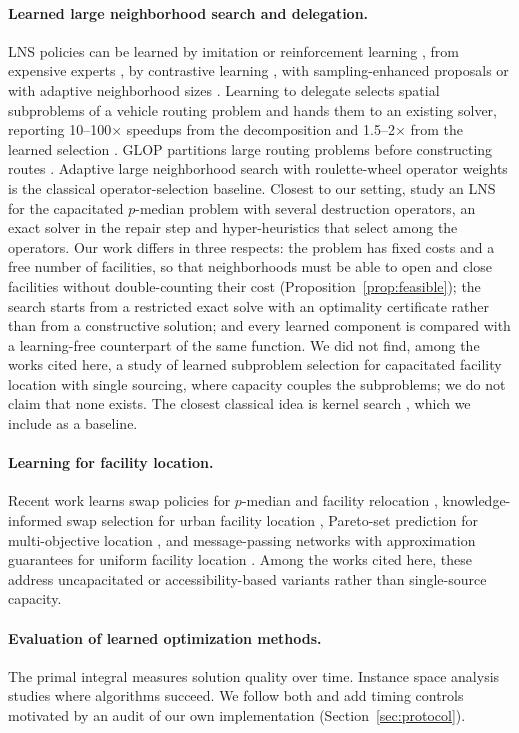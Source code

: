 \paragraph{Learned large neighborhood search and delegation.}
LNS policies can be learned by imitation or reinforcement learning \citep{song2020},
from expensive experts \citep{sonnerat2021}, by contrastive learning \citep{huang2023}, with
sampling-enhanced proposals \citep{feng2025spl} or with adaptive neighborhood sizes
\citep{xu2025hypaso}. Learning to delegate selects spatial subproblems of a vehicle routing
problem and hands them to an existing solver, reporting 10--100$\times$ speedups from the
decomposition and 1.5--2$\times$ from the learned selection \citep{li2021delegate}. GLOP
partitions large routing problems before constructing routes \citep{ye2024glop}. Adaptive large
neighborhood search with roulette-wheel operator weights \citep{ropke2006} is the classical
operator-selection baseline. Closest to our setting, \citet{gjergji2026} study an LNS for the
capacitated $p$-median problem with several destruction operators, an exact solver in the repair
step and hyper-heuristics that select among the operators. Our work differs in three respects:
the problem has fixed costs and a free number of facilities, so that neighborhoods must be able
to open and close facilities without double-counting their cost
(Proposition~\ref{prop:feasible}); the search starts from a restricted exact solve with an
optimality certificate rather than from a constructive solution; and every learned component is
compared with a learning-free counterpart of the same function. We did not find, among the works cited here, a study of learned
subproblem selection for capacitated facility location with single
sourcing, where capacity couples the subproblems; we do not claim that none exists. The closest
classical idea is kernel search
\citep{guastaroba2014}, which we include as a baseline.

\paragraph{Learning for facility location.}
Recent work learns swap policies for $p$-median and facility relocation \citep{guo2023swap},
knowledge-informed swap selection for urban facility location \citep{su2024urban}, Pareto-set
prediction for multi-objective location \citep{liu2022pareto}, and message-passing networks with
approximation guarantees for uniform facility location \citep{qian2026unifl}. Among the works cited here, these address
uncapacitated or accessibility-based variants rather than single-source capacity.

\paragraph{Evaluation of learned optimization methods.}
The primal integral \citep{berthold2013} measures solution quality over time. Instance space
analysis \citep{smithmiles2023} studies where algorithms succeed. We follow both and add timing
controls motivated by an audit of our own implementation (Section~\ref{sec:protocol}).
